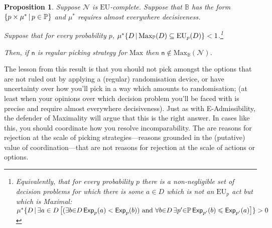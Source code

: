 \documentclass[a4paper]{article}
\newtheorem{proposition}[theorem]{Proposition}
\renewcommand\P{\mathbb{P}} %
\newcommand\Exp{\mathsf{Exp}}
\newcommand\EU{\mathrm{EU}}
\newcommand\Maximality{\mathrm{Max}}
\newcommand{\n}{\mathsf{n}}
\newcommand\Nu{\mathcal{N}}
\newcommand{\IB}{\mathbb{B}}
\newcommand{\IP}{\P}
\newcommand{\todoold}[2][]{\todo[backgroundcolor=white,bordercolor=orange!10,linecolor=gray!10, #1,caption={},textcolor=gray]{Pre-rev: #2}}
\renewcommand{\color}[1]{}
\newcommand\SetDelimiter[1][]{
	\nonscript\,#1\vert \allowbreak \nonscript\,\mathopen{}}
\providecommand\given{\SetDelimiter}
\renewcommand{\leq}{\leqslant}
\newenvironment{CCM rewritten}
{\begingroup\color{blue}} %
{\endgroup}              %
\begin{document}

\begin{proposition}\label{thm:max-nu-reg-nec}
	Suppose $\Nu$ is $\EU$-complete. 
	Suppose that $\IB$ has the form $\{p\times \mu^*\given p\in \IP\}$ and $\mu^*$ requires almost everywhere decisiveness.

	Suppose that for every probability $p$, $\mu^*\{D\given \Maximality_\IP(D)\subseteq\EU_p(D)\}< 1$.\footnote{Equivalently, that for every probability $p$ there is a non-negligible set of decision problems for which there is some $a\in D$ which is not an $\EU_p$ act but which is Maximal: $\mu^*\{D\given \exists a\in D\left[(\exists b{\in} D \, \Exp_{p}(a)<\Exp_{p}(b))\text{ and }\forall b{\in} D\, \exists p'{\in}\IP \,\Exp_{p'}(b)\leq \Exp_{p'}(a)\right]\}>0$}
	
	Then, if $\n$ is regular picking strategy for $\Maximality$ then $\n\notin \Maximality_\IB(\Nu)$.
\end{proposition}


	The lesson from this result is that you should not pick amongst the options that are not ruled out by applying a (regular) randomisation device, or have uncertainty over how you'll pick in a way which amounts to randomisation; (at least when your opinions over which decision problem you'll be faced with is precise and require almost everywhere decisiveness). 
	Just as with E-Admissibility, the defender of Maximality will argue that this is the right answer. In cases like this, you should coordinate how you resolve incomparability. The are reasons for rejection at the scale of picking strategies---reasons grounded in the (putative) value of coordination---that are not reasons for rejection at the scale of actions or options. 
	
\todoold{I rewrote this from JKs comment}
\end{document}
